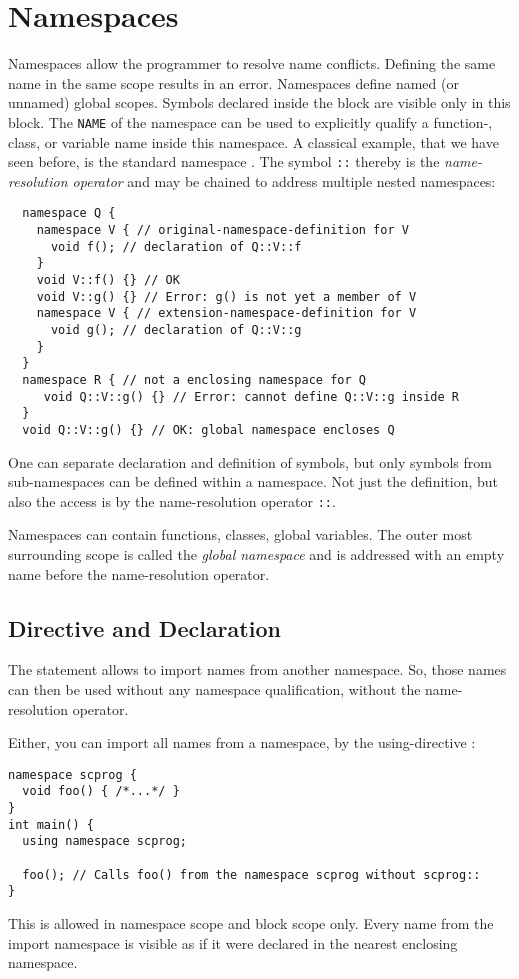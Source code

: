 \section{Namespaces\label{sec:namespace}}
Namespaces allow the programmer to resolve name conflicts. Defining the same name in the same scope results in an error. Namespaces define
named (or unnamed) global scopes.
%
%
Symbols declared inside the  block are visible only in this block. The \texttt{NAME} of the namespace can be used to explicitly
qualify a function-, class, or variable name inside this namespace. A classical example, that we have seen before, is the standard namespace .
The symbol \texttt{::} thereby is the \emph{name-resolution operator} and may be chained to address multiple nested namespaces:
%
\begin{verbatim}
  namespace Q {
    namespace V { // original-namespace-definition for V
      void f(); // declaration of Q::V::f
    }
    void V::f() {} // OK
    void V::g() {} // Error: g() is not yet a member of V
    namespace V { // extension-namespace-definition for V
      void g(); // declaration of Q::V::g
    }
  }
  namespace R { // not a enclosing namespace for Q
     void Q::V::g() {} // Error: cannot define Q::V::g inside R
  }
  void Q::V::g() {} // OK: global namespace encloses Q
\end{verbatim}
%
One can separate declaration and definition of symbols, but only symbols from sub-namespaces can be defined within a namespace. Not just the definition,
but also the access is by the name-resolution operator \texttt{::}.

Namespaces can contain functions, classes, global variables. The outer most surrounding scope is called the \emph{global namespace} and is addressed with
an empty name before the name-resolution operator.

\subsection{ Directive and Declaration}
The statement  allows to import names from another namespace. So, those names can then be used without any namespace qualification, without the
name-resolution operator.

Either, you can import all names from a namespace, by the using-directive :
%
\begin{verbatim}
namespace scprog {
  void foo() { /*...*/ }
}
int main() {
  using namespace scprog;

  foo(); // Calls foo() from the namespace scprog without scprog::
}
\end{verbatim}
This is allowed in namespace scope and block scope only. Every name from the import namespace is visible as if it were declared in the nearest enclosing namespace.

